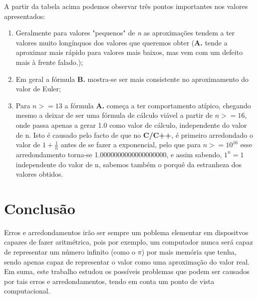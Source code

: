 \documentclass[12pt, letterpaper]{article}
\begin{document}
A partir da tabela acima podemos observar três pontos importantes nos valores apresentados:

\begin{enumerate}
    \item Geralmente para valores "pequenos" de \textit{n} as aproximações tendem a ter valores muito longínquos dos valores que queremos obter (\textbf{A.} tende a aproximar mais rápido para valores mais baixos, mas vem com um defeito mais à frente falado.);
    \item Em geral a fórmula \textbf{B.} mostra-se ser mais consistente no aproximamento do valor de Euler;
    \item Para $n >= 13$ a fórmula \textbf{A.} começa a ter comportamento atípico, chegando mesmo a deixar de ser uma fórmula de cálculo viável a partir de $n >= 16$, onde passa apenas a gerar 1.0 como valor de cálculo, independente do valor de n. Isto é causado pelo facto de que no \textbf{C/C++}, é primeiro arredondado o valor de $1+\frac{1}{n}$ antes de se fazer a exponencial, pelo que para $n >= 10^{16}$ esse arredondamento torna-se 1.0000000000000000000, e assim sabendo, $1^n = 1$ independente do valor de n, sabemos também o porquê da estranheza dos valores obtidos.
\end{enumerate}

\section*{Conclusão}
Erros e arredondamentos irão ser sempre um poblema elementar em dispositvos capazes de fazer aritmétrica, pois por exemplo, um computador nunca será capaz de representar um número infinito (como o $\pi$) por mais memória que tenha, sendo apenas capaz de representar o valor como uma aproximação do valor real.
Em suma, este trabalho estudou os possíveis problemas que podem ser causados por tais erros e arredondamentos, tendo em conta um ponto de vista computacional. 
\end{document}
